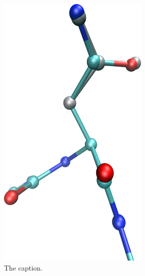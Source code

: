 \begin{figure}[h]
  \centering
  \includegraphics[width=0.65\textwidth]{figures/mutation_side_chain_images/1brs_chain_a_resid_58.png}
  \caption{The caption.}
  \label{figure:computational_mutation_scanning/figname}
\end{figure}

